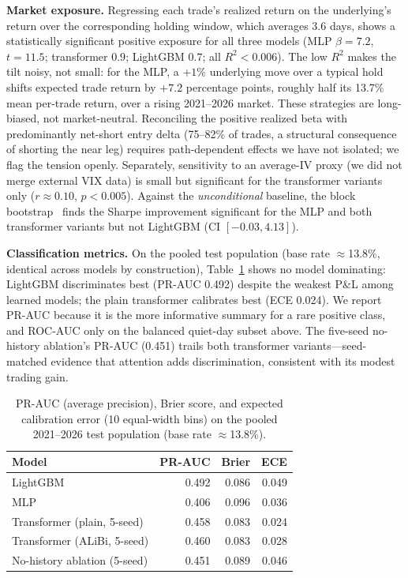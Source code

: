 \documentclass[sigconf,review,anonymous]{acmart}
\begin{document}
\noindent\textbf{Market exposure.} Regressing each trade's realized return on the underlying's return over the corresponding holding window, which averages 3.6 days, shows a statistically significant positive exposure for all three models (MLP $\beta=7.2$, $t=11.5$; transformer $0.9$; LightGBM $0.7$; all $R^2<0.006$). The low $R^2$ makes the tilt noisy, not small: for the MLP, a $+1\%$ underlying move over a typical hold shifts expected trade return by $+7.2$ percentage points, roughly half its 13.7\% mean per-trade return, over a rising 2021--2026 market. These strategies are long-biased, not market-neutral. Reconciling the positive realized beta with predominantly net-short entry delta (75--82\% of trades, a structural consequence of shorting the near leg) requires path-dependent effects we have not isolated; we flag the tension openly. Separately, sensitivity to an average-IV proxy (we did not merge external VIX data) is small but significant for the transformer variants only ($r\approx0.10$, $p<0.005$). Against the \emph{unconditional} baseline, the block bootstrap~\cite{kunsch1989} finds the Sharpe improvement significant for the MLP and both transformer variants but not LightGBM (CI $[-0.03,4.13]$).

\noindent\textbf{Classification metrics.} On the pooled test population (base rate $\approx$13.8\%, identical across models by construction), Table~\ref{tab:calibration} shows no model dominating: LightGBM discriminates best (PR-AUC 0.492) despite the weakest P\&L among learned models; the plain transformer calibrates best (ECE 0.024). We report PR-AUC because it is the more informative summary for a rare positive class, and ROC-AUC only on the balanced quiet-day subset above. The five-seed no-history ablation's PR-AUC (0.451) trails both transformer variants---seed-matched evidence that attention adds discrimination, consistent with its modest trading gain.

\begin{table}[t]
\centering
\footnotesize
\begin{tabular}{lrrr}
\toprule
Model & PR-AUC & Brier & ECE \\
\midrule
LightGBM & 0.492 & 0.086 & 0.049 \\
MLP & 0.406 & 0.096 & 0.036 \\
Transformer (plain, 5-seed) & 0.458 & 0.083 & 0.024 \\
Transformer (ALiBi, 5-seed) & 0.460 & 0.083 & 0.028 \\
No-history ablation (5-seed) & 0.451 & 0.089 & 0.046 \\
\bottomrule
\end{tabular}
\caption{PR-AUC (average precision), Brier score, and expected calibration error (10 equal-width bins) on the pooled 2021--2026 test population (base rate $\approx$13.8\%).}
\label{tab:calibration}
\end{table}
\end{document}
